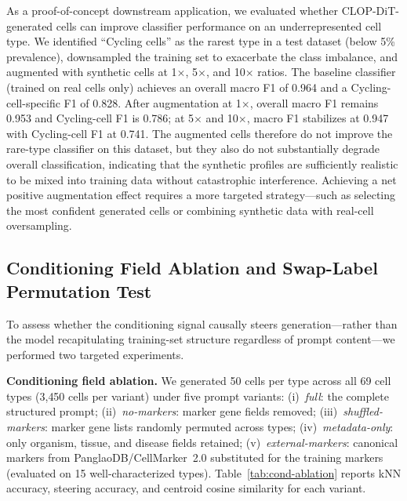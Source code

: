 \documentclass[preprint,12pt]{elsarticle}
\begin{document}
As a proof-of-concept downstream application, we evaluated whether CLOP-DiT-generated cells can improve classifier performance on an underrepresented cell type. We identified ``Cycling cells'' as the rarest type in a test dataset (below 5\% prevalence), downsampled the training set to exacerbate the class imbalance, and augmented with synthetic cells at 1$\times$, 5$\times$, and 10$\times$ ratios. The baseline classifier (trained on real cells only) achieves an overall macro F1 of 0.964 and a Cycling-cell-specific F1 of 0.828. After augmentation at 1$\times$, overall macro F1 remains 0.953 and Cycling-cell F1 is 0.786; at 5$\times$ and 10$\times$, macro F1 stabilizes at 0.947 with Cycling-cell F1 at 0.741. The augmented cells therefore do not improve the rare-type classifier on this dataset, but they also do not substantially degrade overall classification, indicating that the synthetic profiles are sufficiently realistic to be mixed into training data without catastrophic interference. Achieving a net positive augmentation effect requires a more targeted strategy---such as selecting the most confident generated cells or combining synthetic data with real-cell oversampling.

\subsection{Conditioning Field Ablation and Swap-Label Permutation Test}\label{sec:cond-ablation}

To assess whether the conditioning signal causally steers generation---rather than the model recapitulating training-set structure regardless of prompt content---we performed two targeted experiments.

\textbf{Conditioning field ablation.} We generated 50 cells per type across all 69 cell types (3{,}450 cells per variant) under five prompt variants: (i)~\emph{full}: the complete structured prompt; (ii)~\emph{no-markers}: marker gene fields removed; (iii)~\emph{shuffled-markers}: marker gene lists randomly permuted across types; (iv)~\emph{metadata-only}: only organism, tissue, and disease fields retained; (v)~\emph{external-markers}: canonical markers from PanglaoDB/CellMarker~2.0 substituted for the training markers (evaluated on 15 well-characterized types). Table~\ref{tab:cond-ablation} reports kNN accuracy, steering accuracy, and centroid cosine similarity for each variant.
\end{document}
